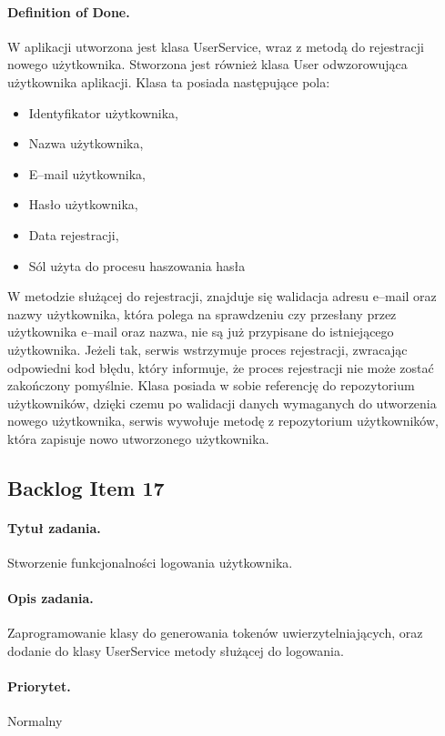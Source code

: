 \documentclass[a4paper]{article}
\begin{document}
\paragraph{Definition of Done.} W aplikacji utworzona jest klasa UserService, wraz z metodą do rejestracji nowego użytkownika. Stworzona jest również klasa User odwzorowująca użytkownika aplikacji. Klasa ta posiada następujące pola: 
\begin{itemize}
\item Identyfikator użytkownika, 
\item Nazwa użytkownika,
\item E--mail użytkownika, 
\item Hasło użytkownika, 
\item Data rejestracji, 
\item Sól użyta do procesu haszowania hasła
\end{itemize}
W metodzie służącej do rejestracji, znajduje się walidacja adresu e--mail oraz nazwy użytkownika, która polega na sprawdzeniu czy przesłany przez użytkownika e--mail oraz nazwa, nie są już przypisane do istniejącego użytkownika. Jeżeli tak, serwis wstrzymuje proces rejestracji, zwracając odpowiedni kod błędu, który informuje, że proces rejestracji nie może zostać zakończony pomyślnie. Klasa posiada w sobie referencję do repozytorium użytkowników, dzięki czemu po walidacji danych wymaganych do utworzenia nowego użytkownika, serwis wywołuje metodę z repozytorium użytkowników, która zapisuje nowo utworzonego użytkownika. 

\subsection{Backlog Item 17} 
\paragraph{Tytuł zadania.} Stworzenie funkcjonalności logowania użytkownika.
\paragraph{Opis zadania.} Zaprogramowanie klasy do generowania tokenów uwierzytelniających, oraz dodanie do klasy UserService metody służącej do logowania.
\paragraph{Priorytet.} Normalny
\end{document}

